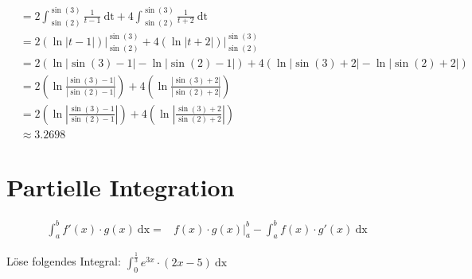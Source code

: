 \documentclass[11pt, a4paper]{article}
\providecommand{\abs}[1]{\left\lvert#1\right\rvert}
\providecommand{\dx}{\ \mathrm{dx}}
\providecommand{\dt}{\ \mathrm{dt}}
\begin{document}
\begin{align*}
	 &= 2 \int_{\sin(2)}^{\sin(3)} \frac{1}{t-1} \dt + 4 \int_{\sin(2)}^{\sin(3)} \frac{1}{t+2} \dt \\
	 &= 2 \left. \left( \ln\abs{t-1} \right) \right\vert_{\sin(2)}^{\sin(3)} + 4 \left. \left( \ln\abs{t+2} \right) \right\vert_{\sin(2)}^{\sin(3)} \\
	 &= 2 \left( \ln\abs{\sin(3)-1} - \ln\abs{\sin(2)-1} \right) + 4 \left( \ln\abs{\sin(3) + 2} - \ln\abs{\sin(2) + 2} \right) \\
	 &= 2 \left( \ln \frac{\abs{\sin(3)-1}}{\abs{\sin(2)-1}} \right) + 4 \left( \ln \frac{\abs{\sin(3) + 2}}{\abs{\sin(2) + 2}} \right) \\
	 &= 2 \left( \ln \abs{\frac{\sin(3)-1}{\sin(2)-1}} \right) + 4 \left( \ln \abs{\frac{\sin(3) + 2}{\sin(2) + 2}} \right) \\
	 &\approx 3.2698
\end{align*}

\newpage
\section{Partielle Integration}
\begin{align}
	\int_a^b f'(x) \cdot g(x) \dx =& f(x) \cdot g(x)\vert_a^b - \int_a^b f(x) \cdot g'(x) \dx
	\label{eq:partielleIntegration}
\end{align}

\newcommand{\lowerBorder}{{0}}
\newcommand{\upperBorder}{{\frac{1}{3}}}
Löse folgendes Integral: $\displaystyle \int_\lowerBorder^\upperBorder e^{3x} \cdot (2x - 5) \dx$
\end{document}
